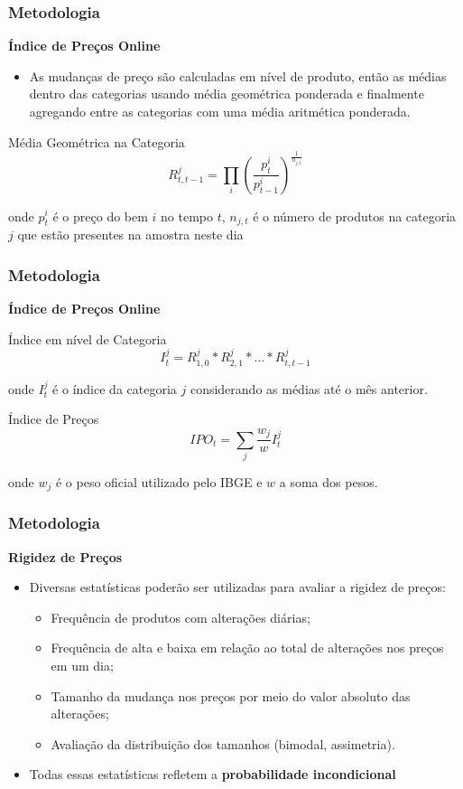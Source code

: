 \documentclass[aspectratio=169]{beamer}
\begin{document}
\begin{frame}\frametitle{Metodologia}
  \textbf{Índice de Preços Online}
  \begin{itemize}
  \item As mudanças de preço são calculadas em nível de produto, então as médias dentro das categorias usando média geométrica ponderada e finalmente agregando entre as categorias com uma média aritmética ponderada. 
  \end{itemize}
  \begin{exampleblock}{Média Geométrica na Categoria}
  \[
  R_{t,t-1}^{j}=\prod_{i}(\frac{p_{t}^{i}}{p_{t-1}^{i}})^{\frac{1}{n_{j,t}}}
  \]
  \end{exampleblock}
onde $p_{t}^{i}$ é o preço do bem $i$ no tempo $t$, ${n_{j,t}}$ é o número de produtos na categoria $j$ que estão presentes na amostra neste dia
\end{frame}

\begin{frame}\frametitle{Metodologia}
  \textbf{Índice de Preços Online}
  \begin{exampleblock}{Índice em nível de Categoria}
  \[
  I_{t}^{j}=R_{1,0}^{j}\ast{R}_{2,1}^{j}\ast{...}\ast{R}_{t,t-1}^{j}
  \]
  \end{exampleblock}
onde $I_{t}^{j}$ é o índice da categoria $j$ considerando as médias até o mês anterior.
 \begin{exampleblock}{Índice de Preços}
  \[
  IPO_{t}=\sum_{j}{\frac{w_{j}}{w}I_{t}^{j}} 
  \]
  \end{exampleblock}
onde $w_{j}$ é o peso oficial utilizado pelo IBGE e ${w}$ a soma dos pesos. 
\end{frame}

\begin{frame}\frametitle{Metodologia}
  \textbf{Rigidez de Preços}
  \begin{itemize}
  \item Diversas estatísticas poderão ser utilizadas para avaliar a rigidez de preços:
    \begin{itemize}
    \item Frequência de produtos com alterações diárias;
    \item Frequência de alta e baixa em relação ao total de alterações nos preços em um dia;
    \item Tamanho da mudança nos preços por meio do valor absoluto das alterações;
    \item Avaliação da distribuição dos tamanhos (bimodal, assimetria).
    \end{itemize}
  \item Todas essas estatísticas refletem a \textbf{probabilidade incondicional}
  \end{itemize}
\end{frame}
\end{document}
